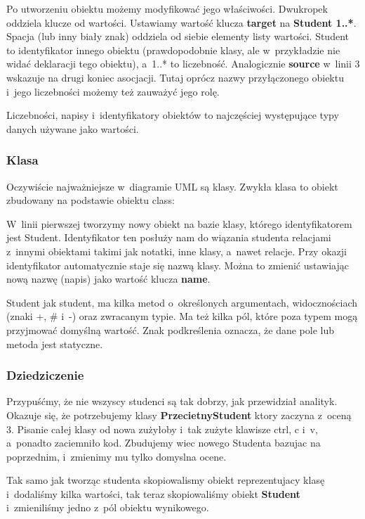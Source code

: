 \documentclass[a4paper,11pt,title]{report}
\begin{document}
Po utworzeniu obiektu możemy modyfikować jego właściwości. Dwukropek oddziela klucze od wartości.
Ustawiamy wartość klucza \textbf{target} na \textbf{Student 1..*}. Spacja (lub inny biały znak)
oddziela od siebie elementy listy wartości. Student to identyfikator innego obiektu (prawdopodobnie
klasy, ale w~przykładzie nie widać deklaracji tego obiektu), a~1..* to liczebność. Analogicznie
\textbf{source} w~linii 3 wskazuje na drugi koniec asocjacji. Tutaj oprócz nazwy przyłączonego
obiektu i~jego liczebności możemy też zauważyć jego rolę.

Liczebności, napisy i~identyfikatory obiektów to najczęściej występujące typy danych używane jako
wartości.

\subsubsection{Klasa}
Oczywiście najważniejsze w~diagramie UML są klasy. Zwykła klasa to obiekt zbudowany na podstawie
obiektu class:



W~linii pierwszej tworzymy nowy obiekt na bazie klasy, którego identyfikatorem jest Student.
Identyfikator ten posłuży nam do wiązania studenta relacjami z~innymi obiektami takimi jak notatki,
inne klasy, a~nawet relacje. Przy okazji identyfikator automatycznie staje się nazwą klasy. Można to
zmienić ustawiając nową nazwę (napis) jako wartość klucza \textbf{name}.

Student jak student, ma kilka metod o~określonych argumentach, widocznościach (znaki +,
\# i~-) oraz zwracanym typie. Ma też kilka pól, które poza typem mogą przyjmować domyślną wartość.
Znak podkreślenia oznacza, że dane pole lub metoda jest statyczne.

\subsubsection{Dziedziczenie}
Przypuśćmy, że nie wszyscy studenci są tak dobrzy, jak przewidział analityk. Okazuje się, że
potrzebujemy klasy \textbf{PrzecietnyStudent} ktory zaczyna z~oceną 3. Pisanie całej klasy od nowa
zużyłoby i~tak zużyte klawisze ctrl, c i~v, a~ponadto zaciemniło kod. Zbudujemy wiec nowego Studenta
bazujac na poprzednim, i~zmienimy mu tylko domyslna ocene.



Tak samo jak tworząc studenta skopiowalismy obiekt reprezentujacy klasę i~dodaliśmy kilka
wartości, tak teraz skopiowaliśmy obiekt \textbf{Student} i~zmieniliśmy jedno z~pól obiektu
wynikowego.
\end{document}
